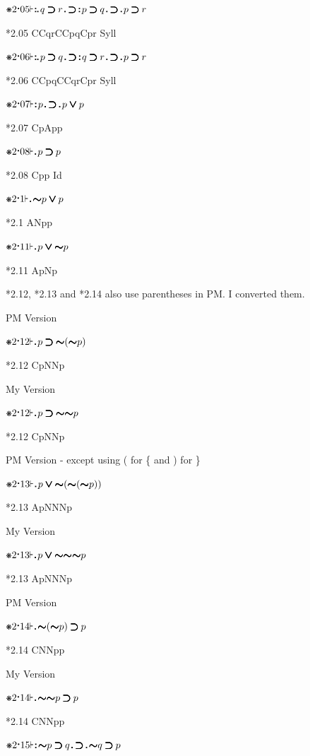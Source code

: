 \documentclass[12pt]{article}
\newcommand{\pmthm}{\mathpunct{\text{\scalebox{.5}[1]{$\boldsymbol\vdash$}}}} %
\newcommand{\pmast}{\text{\resizebox{!}{.75\height}{\ding{107}}}} %
\newcommand{\pmcdot}{\text{\raisebox{.05cm}{$\boldsymbol\cdot$}}} %
\newcommand{\pmd}{\hbox{\rule{.3ex}{.3ex}}} %
\newcommand{\pmdd}{\overset{\pmd}{\pmd}} %
\newcommand{\pmdot}{\mathinner{\pmd}}
\newcommand{\pmdott}{\mathinner{\pmdd}}
\newcommand{\pmdottt}{\mathinner{\pmdd\hspace{1pt}\pmd}}
\newcommand{\pmnot}{\mathord{\ooalign{$\boldsymbol{\sim}\mkern.5mu$\hidewidth\cr$\boldsymbol{\sim}$\cr\hidewidth$\mkern.5mu\boldsymbol{\sim}$}}}
\newcommand{\pmor}{\mathbin{\ooalign{$\boldsymbol{\vee}\mkern.5mu$\hidewidth\cr$\boldsymbol{\vee}$\cr\hidewidth$\mkern.5mu\boldsymbol{\vee}$}}}
\newcommand{\pmimp}{\mathbin{\ooalign{$\boldsymbol{\supset}\mkern.5mu$\hidewidth\cr$\boldsymbol{\supset}$\cr\hidewidth$\mkern.5mu\boldsymbol{\supset}$}}} %
\begin{document}
$\pmast 2 \pmcdot 05 \pmthm \pmdottt q \pmimp r \pmdot \pmimp \pmdott p \pmimp q \pmdot \pmimp \pmdot p \pmimp r $

*2.05 CCqrCCpqCpr Syll

$\pmast 2 \pmcdot 06 \pmthm \pmdottt p \pmimp q \pmdot \pmimp \pmdott q \pmimp r \pmdot \pmimp \pmdot p \pmimp r $

*2.06 CCpqCCqrCpr Syll

$\pmast 2 \pmcdot 07 \pmthm \pmdott p \pmdot \pmimp \pmdot p \pmor p $

*2.07 CpApp

$\pmast 2 \pmcdot 08 \pmthm \pmdot p \pmimp p $

*2.08 Cpp Id

$\pmast 2 \pmcdot 1 \pmthm \pmdot \pmnot p \pmor p $

*2.1 ANpp

$\pmast 2 \pmcdot 11 \pmthm \pmdot p \pmor \pmnot p $

*2.11 ApNp

*2.12, *2.13 and *2.14  also use parentheses in PM. I converted them.
 
PM Version

$\pmast 2 \pmcdot 12 \pmthm \pmdot p \pmimp \pmnot ( \pmnot p ) $

*2.12 CpNNp

My Version

$\pmast 2 \pmcdot 12 \pmthm \pmdot p \pmimp \pmnot \pmnot p $


*2.12 CpNNp

PM Version - except using ( for \{ and ) for \}

$\pmast 2 \pmcdot 13 \pmthm \pmdot p \pmor \pmnot ( \pmnot ( \pmnot p ) ) $

*2.13 ApNNNp

My Version

$\pmast 2 \pmcdot 13 \pmthm \pmdot p \pmor \pmnot \pmnot \pmnot p $

*2.13 ApNNNp

PM Version

$\pmast 2 \pmcdot 14 \pmthm \pmdot \pmnot ( \pmnot p ) \pmimp p $

*2.14 CNNpp

My Version

$\pmast 2 \pmcdot 14 \pmthm \pmdot \pmnot \pmnot p \pmimp p $

*2.14 CNNpp

$\pmast 2 \pmcdot 15 \pmthm \pmdott \pmnot p \pmimp q \pmdot \pmimp \pmdot \pmnot q \pmimp p $
\end{document}
